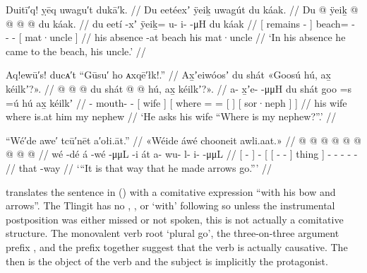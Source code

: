 \ex\label{ex:91-34-after-beach-uncle}%
%
\begingl
	\glpreamble	Duitī′q! ỵēq uwagu′t dukā′k. //
	\glpreamble	Du eetéexʼ ÿeiḵ uwagút du káak. //
	\gla	{} Du  @ {} {}
		ÿeiḵ @  @ {} @ {} @ {}
		{} du káak. {} //
	\glb	{} du eetí -xʼ {}
		ÿeiḵ= u- i-  -μH
		{} du káak {} //
	\glc	{}[  remains - {}]
		beach= - -  -
		{}[  mat·uncle {}] //
	\gld	{} his absence -at {}
		beach  {} {} {}
		{} his mat·uncle {} //
	\glft	‘In his absence he came to the beach, his uncle.’
		//
\endgl
\xe

\ex\label{ex:91-35-asks-wife-where-nephew}%
%
\begingl
	\glpreamble	Aq!ewū′s! ducᴀ′t “Gūsu′ ho ᴀxqē′łk!.” //
	\glpreamble	Ax̱ʼeiwóosʼ du shát «\!Goosú hú, ax̱ kéilkʼ?\!». //
	\gla	{} @ {} @ {} @ {}
		{} du shát {}
		{}  @ {} @ {} {} hú, {}
			{} ax̱ kéilkʼ?\!». {} {} //
	\glb	a- x̱ʼe-  -μμH
		{} du shát {}
		{} goo =s =ú {} hú {}
			{} ax̱ kéilkʼ {} //
	\glc	{}- mouth-  -
		{}[  wife {}]
		{}[ where = = {}[  {}]
			{}[  sor·neph {}] {}] //
	\gld	{} {} {} {}
		{} his wife {}
		{} where \• \•is.at {} him {}
			{} my nephew {} {} //
	\glft	‘He asks his wife “Where is my nephew?”.’
		//
\endgl
\xe

\ex\label{ex:91-36-went-thattaway}%
%
\begingl
	\glpreamble	“Wé′de awe′ tcū′nēt a′ołi.āt.” //
	\glpreamble	«\!Wéide áwé chooneit awli.aat.\!» //
	\gla	{}  @ {} {}  @ {}
		{} {}  @ {} @ {} {} {} {}
		 @ {} @ {} @ {} @ {} @ {} //
	\glb	{} wé -dé {} á -wé
		{} {}  -μμL -i {} át {}
		a- wu- l- i-  -μμL //
	\glc	{}[  - {}]  -
		{}[ {}[  - - {}] thing {}]
		- - - -  - //
	\gld	{} that -way {}  {}
		{} {}  {} {} {} {} {}
		 {} {} {} {} {} //
	\glft	‘“It is that way that he made arrows go.”’
		//
\endgl
\xe

\citeauthor{swanton:1909} translates the sentence in (\lastx) with a comitative expression “with his bow and arrows”.
The Tlingit has no , , or  ‘with’ following  so unless the instrumental postposition was either missed or not spoken, this is not actually a comitative structure.
The monovalent verb root  ‘plural go’, the three-on-three argument prefix , and the  prefix together suggest that the verb is actually causative.
The  then is the object of the verb and the subject is implicitly the protagonist.

